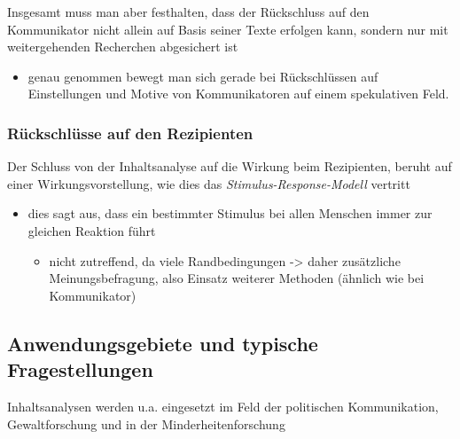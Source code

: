 \documentclass[11pt]{article}
\begin{document}
Insgesamt muss man aber festhalten, dass der Rückschluss auf den Kommunikator nicht allein auf Basis seiner Texte erfolgen kann, sondern nur mit weitergehenden Recherchen abgesichert ist
\begin{itemize}
\item genau genommen bewegt man sich gerade bei Rückschlüssen auf Einstellungen und Motive von Kommunikatoren auf einem spekulativen Feld.
\end{itemize}
\subsubsection{Rückschlüsse auf den Rezipienten}
\label{sec:orgfa84b31}
Der Schluss von der Inhaltsanalyse auf die Wirkung beim Rezipienten, beruht auf einer Wirkungsvorstellung, wie dies das \emph{Stimulus-Response-Modell} vertritt
\begin{itemize}
\item dies sagt aus, dass ein bestimmter Stimulus bei allen Menschen immer zur gleichen Reaktion führt
\begin{itemize}
\item nicht zutreffend, da viele Randbedingungen -> daher zusätzliche Meinungsbefragung, also Einsatz weiterer Methoden (ähnlich wie bei Kommunikator)
\end{itemize}
\end{itemize}
\subsection{Anwendungsgebiete und typische Fragestellungen}
\label{sec:org1726ceb}
Inhaltsanalysen werden u.a. eingesetzt im Feld der politischen Kommunikation, Gewaltforschung und in der Minderheitenforschung
\end{document}
